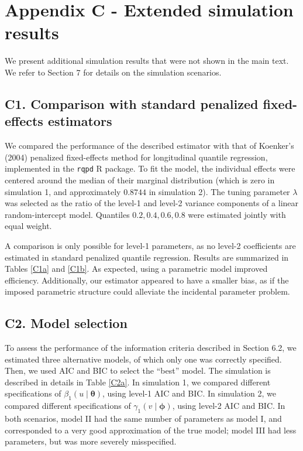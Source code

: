 \documentclass[12pt]{article}
\def\thetavec{\bm{\theta}}
\def\phivec{\bm{\phi}}
\begin{document}
\newpage
\section*{Appendix C - Extended simulation results}

We present additional simulation results that were not shown in the main text. We refer to Section 7 %
for details on the simulation scenarios.

\subsection*{{\bf C1}. Comparison with standard penalized fixed-effects estimators}

We compared the performance of the described estimator with that of Koenker's (2004) penalized fixed-effects 
method for longitudinal quantile regression, implemented in the \texttt{rqpd} R package. 
To fit the model, the individual effects were centered around the median of their marginal distribution (which is zero
in simulation 1, and approximately $0.8744$ in simulation 2).
The tuning parameter $\lambda$ was selected as the ratio of the level-1 and level-2 variance components of 
a linear random-intercept model. Quantiles $0.2, 0.4, 0.6, 0.8$ were estimated jointly with equal weight.

A comparison is only possible for level-1 parameters, as no level-2 coefficients are estimated in
standard penalized quantile regression. Results are summarized in Tables \ref{C1a} and \ref{C1b}.
As expected, using a parametric model improved efficiency. Additionally, our estimator appeared
to have a smaller bias, as if the imposed parametric structure could alleviate the incidental parameter problem.


\subsection*{{\bf C2}. Model selection}
To assess the performance of the information criteria described in Section 6.2, %
we estimated three alternative models, of which only one was correctly specified.
Then, we used \textsc{AIC} and \textsc{BIC} to select the ``best'' model.
The simulation is described in details in Table \ref{C2a}. In simulation 1, we
compared different specifications of $\beta_1(u \mid \thetavec)$, using level-1 \textsc{AIC} and \textsc{BIC}.
In simulation 2, we compared different specifications of $\gamma_1(v \mid \phivec)$, using level-2 \textsc{AIC} and \textsc{BIC}.
In both scenarios, model II had the same number of parameters as model I, and corresponded to a very good approximation of the true model;
model III had less parameters, but was more severely misspecified. 
\end{document}
